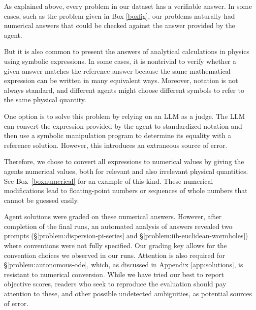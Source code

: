 \documentclass[aps,prd,reprint,superscriptaddress,nofootinbib]{revtex4-2}
\newcommand{\problemsymbol}{\S}
\DeclareRobustCommand{\problemref}[1]{\hyperref[#1]{\mbox{\problemsymbol\ref*{#1}}}}
\begin{document}
As explained above, every problem in our dataset has a verifiable answer. In some cases, such as the problem given in Box \ref{boxfig}, our problems naturally had numerical answers that could be checked against the answer provided by the agent.

But it is also common to present the answers of analytical calculations in physics using symbolic expressions. In some cases, it is nontrivial to verify whether a given answer matches the reference answer because the same mathematical expression can be written in many equivalent ways. Moreover, notation is not always standard, and different agents might choose different symbols to refer to the same physical quantity. 

One option is to solve this problem by relying on an LLM as a judge. The LLM can convert the expression provided by the agent to standardized notation and then use a symbolic manipulation program to determine its equality with a reference solution. However, this introduces an extraneous source of error.

Therefore, we chose to convert all expressions to numerical values by giving the agents numerical values, both for relevant and also irrelevant physical quantities. See Box~\ref{boxnumerical} for an example of this kind. These numerical modifications lead to floating-point numbers or sequences of whole numbers that cannot be guessed easily.

Agent solutions were graded on these numerical answers. However, after completion of the final runs, an automated analysis of answers revealed two prompts (\problemref{problem:dispersion-pi-series} and \problemref{problem:iib-euclidean-wormholes})  where conventions were not fully specified.  Our grading key allows for the convention choices we observed in our runs.  Attention is also required for \problemref{problem:autonomous-ode}, which, as discussed in Appendix \ref{app:solutions}, is resistant to numerical conversion. While we have tried our best to report objective scores, readers who seek to reproduce the evaluation should pay attention to these, and other possible undetected ambiguities, as potential sources of error.
\end{document}
